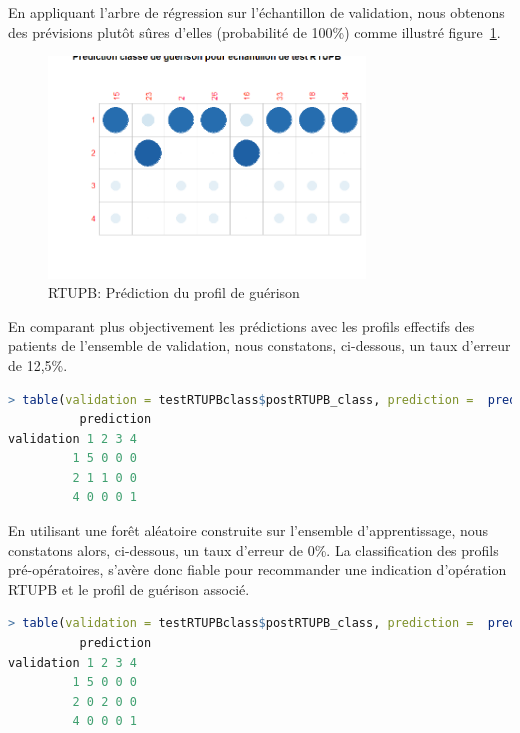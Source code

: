 En appliquant l'arbre de régression sur l'échantillon de validation, nous obtenons des prévisions plutôt sûres d'elles (probabilité de 100\%) comme illustré figure~\ref{fig-rtupb-predict-healing-class}.

\begin{figure}[H]
\centering
\includegraphics[width=0.75\textwidth]{../Fig/RTUPB/rtupb-predict-healing-class.png}
\caption{RTUPB: Prédiction du profil de guérison}
\label{fig-rtupb-predict-healing-class}
\end{figure}

En comparant plus objectivement les prédictions avec les profils effectifs des patients de l'ensemble de validation, nous constatons, ci-dessous, un taux d'erreur de 12,5\%.

\begin{lstlisting}[language=R]
> table(validation = testRTUPBclass$postRTUPB_class, prediction =  predict(dt, testRTUPBclass, type="class"))
          prediction
validation 1 2 3 4
         1 5 0 0 0
         2 1 1 0 0
         4 0 0 0 1
\end{lstlisting}

En utilisant une forêt aléatoire construite sur l'ensemble d'apprentissage, nous constatons alors, ci-dessous, un taux d'erreur de 0\%. La classification des profils pré-opératoires, s'avère donc fiable pour recommander une indication d'opération RTUPB et le profil de guérison associé.

\begin{lstlisting}[language=R]
> table(validation = testRTUPBclass$postRTUPB_class, prediction =  predict(rf, testRTUPBclass))
          prediction
validation 1 2 3 4
         1 5 0 0 0
         2 0 2 0 0
         4 0 0 0 1
\end{lstlisting}


